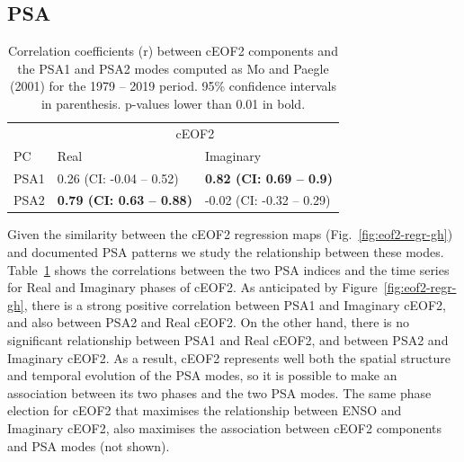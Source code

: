 \documentclass[smallextended]{svjour3}       %
\begin{document}
\hypertarget{psa}{%
\subsection{PSA}\label{psa}}



\begin{table}

\caption{\label{tab:psa-eof2}Correlation coefficients (r) between cEOF2 components and the PSA1 and PSA2 modes computed as Mo and Paegle (2001) for the 1979 -- 2019 period. 95\% confidence intervals in parenthesis. p-values lower than 0.01 in bold.}
\centering
\begin{tabular}[t]{l>{}l>{}l}
\toprule
\multicolumn{1}{c}{} & \multicolumn{2}{c}{cEOF2} \\
\cmidrule(l{3pt}r{3pt}){2-3}
PC & Real & Imaginary\\
\midrule
PSA1 & 0.26 (CI: -0.04 -- 0.52) & \textbf{0.82 (CI: 0.69 -- 0.9)}\\
PSA2 & \textbf{0.79 (CI: 0.63 -- 0.88)} & -0.02 (CI: -0.32 -- 0.29)\\
\bottomrule
\end{tabular}
\end{table}

Given the similarity between the cEOF2 regression maps (Fig.~\ref{fig:eof2-regr-gh}) and documented PSA patterns we study the relationship between these modes.
Table~\ref{tab:psa-eof2} shows the correlations between the two PSA indices and the time series for Real and Imaginary phases of cEOF2.
As anticipated by Figure~\ref{fig:eof2-regr-gh}, there is a strong positive correlation between PSA1 and Imaginary cEOF2, and also between PSA2 and Real cEOF2.
On the other hand, there is no significant relationship between PSA1 and Real cEOF2, and between PSA2 and Imaginary cEOF2.
As a result, cEOF2 represents well both the spatial structure and temporal evolution of the PSA modes, so it is possible to make an association between its two phases and the two PSA modes.
The same phase election for cEOF2 that maximises the relationship between ENSO and Imaginary cEOF2, also maximises the association between cEOF2 components and PSA modes (not shown).
\end{document}
